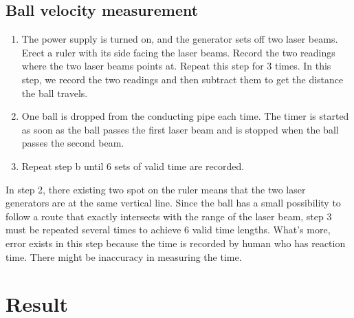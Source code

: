 \documentclass[12pt,a4paper]{article}
\begin{document}
\subsection{Ball velocity measurement} 
\begin{enumerate}
    \item The power supply is turned on, and the generator sets off two laser beams. Erect a ruler with its side facing the laser beams. Record the two readings where the two laser beams points at. Repeat this step for 3 times. In this step, we record the two readings and then subtract them to get the distance the ball travels. 
    \item One ball is dropped from the conducting pipe each time. The timer is started as soon as the ball passes the first laser beam and is stopped when the ball passes the second beam.
    \item Repeat step b until 6 sets of valid time are recorded.
\end{enumerate}
In step 2, there existing two spot on the ruler means that the two laser generators are at the same vertical line. Since the ball has a small possibility to follow a route that exactly intersects with the range of the laser beam, step 3 must be repeated several times to achieve 6 valid time lengths. What’s more, error exists in this step because the time is recorded by human who has reaction time. There might be inaccuracy in measuring the time.

\section{Result}
\end{document}
